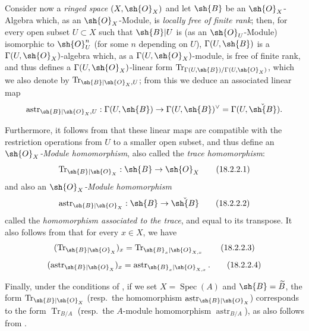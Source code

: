 \begin{env}[18.2.2]
\label{IV.18.2.2}
Consider now a \emph{ringed space} $(X,\sh{O}_X)$ and let $\sh{B}$ be an $\sh{O}_X$-Algebra which, as an $\sh{O}_X$-Module, is \emph{locally free of finite rank};
then, for every open subset $U\subset X$ such that $\sh{B}|U$ is (as an $\sh{O}_U$-Module) isomorphic to $\sh{O}_U^n$ (for some $n$ depending on $U$), $\Gamma(U,\sh{B})$ is a $\Gamma(U,\sh{O}_X)$-algebra which, as a $\Gamma(U,\sh{O}_X)$-module, is free of finite rank, and thus defines a $\Gamma(U,\sh{O}_X)$-linear form $\operatorname{Tr}_{\Gamma(U,\sh{B})/\Gamma(U,\sh{O}_X)}$, which we also denote by $\operatorname{Tr}_{\sh{B}|\sh{O}_X,U}$;
from this we deduce an associated linear map
\[
\operatorname{astr}_{\sh{B}|\sh{O}_X,U}:\Gamma(U,\sh{B})\to\Gamma(U,\sh{B})^\vee=\Gamma(U,\check{\sh{B}}).
\]

Furthermore, it follows from  that these linear maps are compatible with the restriction operations from $U$ to a smaller open subset, and thus define an \emph{$\sh{O}_X$-Module homomorphism}, also called the \emph{trace homomorphism}:
\[
\label{IV.18.2.2.1}
\operatorname{Tr}_{\sh{B}|\sh{O}_X}:\sh{B}\to\sh{O}_X
\tag{18.2.2.1}
\]
and also an \emph{$\sh{O}_X$-Module homomorphism}
\[
\label{IV.18.2.2.2}
\operatorname{astr}_{\sh{B}|\sh{O}_X}:\sh{B}\to\check{\sh{B}}
\tag{18.2.2.2}
\]
called the \emph{homomorphism associated to the trace}, and equal to its transpose.
It also follows from  that for every $x\in X$, we have
\[
\label{IV.18.2.2.3}
(\operatorname{Tr}_{\sh{B}|\sh{O}_X})_x=\operatorname{Tr}_{\sh{B}_x|\sh{O}_{X,x}}
\tag{18.2.2.3}
\]
\[
\label{IV.18.2.2.4}
(\operatorname{astr}_{\sh{B}|\sh{O}_X})_x=\operatorname{astr}_{\sh{B}_x|\sh{O}_{X,x}}.
\tag{18.2.2.4}
\]

Finally, under the conditions of , if we set $X=\operatorname{Spec}(A)$ and $\sh{B}=\widetilde{B}$, the form $\operatorname{Tr}_{\sh{B}|\sh{O}_X}$ (resp.\ the homomorphism $\operatorname{astr}_{\sh{B}|\sh{O}_X}$) corresponds to the form $\operatorname{Tr}_{B/A}$ (resp.\ the $A$-module homomorphism $\operatorname{astr}_{B/A}$), as also follows from .
\end{env}


